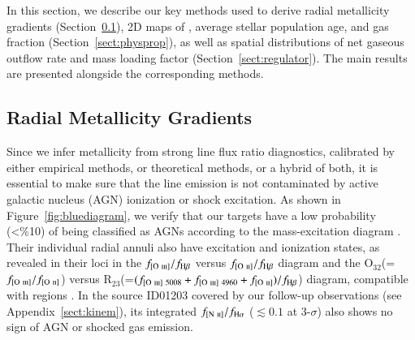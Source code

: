 In this section, we describe our key methods used to derive radial metallicity gradients (Section~\ref{sect:metalgrad}), 2D maps 
of \SFR, average stellar population age, and gas fraction (Section~\ref{sect:physprop}), as well as spatial 
distributions of net gaseous outflow rate and mass loading factor (Section~\ref{sect:regulator}).
The main results are presented alongside the corresponding methods.


\subsection{Radial Metallicity Gradients}\label{sect:metalgrad}

Since we infer metallicity from strong line flux ratio diagnostics, calibrated by either empirical methods, or 
theoretical methods, or a hybrid of both, it is essential to make sure that the line emission is not 
contaminated by active galactic nucleus (AGN) ionization or shock excitation.
As shown in Figure~\ref{fig:bluediagram}, we verify that our targets have a low probability (<\%10) of being 
classified as AGNs according to the mass-excitation diagram \citep{Juneau:2014ca}.
Their individual radial annuli also have excitation and ionization states, as revealed in their loci in the 
$f_{[\textrm{O}~\textsc{iii}]}/f_{\textrm{H}\beta}$ versus $f_{[\textrm{O}~\textsc{ii}]}/f_{\textrm{H}\beta}$ diagram and the O$_{32}$(=$f_{[\textrm{O}~\textsc{iii}]}/f_{[\textrm{O}~\textsc{ii}]}$) versus 
R$_{23}$(=$(f_{[\textrm{O}~\textsc{iii}]~5008} + f_{[\textrm{O}~\textsc{iii}]~4960} + f_{[\textrm{O}~\textsc{ii}]})/f_{\textrm{H}\beta}$) diagram,
compatible with \HII regions \citep{Lamareille:2004jk,Rodrigues:2012dr,2015ApJ...813..126J}.
In the source ID01203 covered by our follow-up \osiris observations (see Appendix~\ref{sect:kinem}), its 
integrated $f_{[\textrm{N}~\textsc{ii}]}/f_{\textrm{H}\alpha}$ ($\lesssim0.1$ at 3-$\sigma$) also shows no sign of AGN or shocked gas emission.

